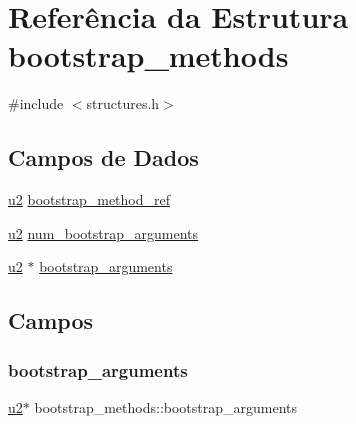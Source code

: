 \hypertarget{structbootstrap__methods}{}\section{Referência da Estrutura bootstrap\+\_\+methods}
\label{structbootstrap__methods}


{\ttfamily \#include $<$structures.\+h$>$}

\subsection*{Campos de Dados}
\begin{DoxyCompactItemize}
\item 
\hyperlink{lista__operandos_8h_a732cde1300aafb73b0ea6c2558a7a54f}{u2} \hyperlink{structbootstrap__methods_a480411f5ca41d770aa9ce24ee7e8e1e8}{bootstrap\+\_\+method\+\_\+ref}
\item 
\hyperlink{lista__operandos_8h_a732cde1300aafb73b0ea6c2558a7a54f}{u2} \hyperlink{structbootstrap__methods_aad28739e25a094400551fd1080fdb1f6}{num\+\_\+bootstrap\+\_\+arguments}
\item 
\hyperlink{lista__operandos_8h_a732cde1300aafb73b0ea6c2558a7a54f}{u2} $\ast$ \hyperlink{structbootstrap__methods_a2204bb6639e44938bda3b11fbb32dd10}{bootstrap\+\_\+arguments}
\end{DoxyCompactItemize}


\subsection{Campos}
\mbox{\label{structbootstrap__methods_a2204bb6639e44938bda3b11fbb32dd10}} 
\subsubsection{\texorpdfstring{bootstrap\+\_\+arguments}{bootstrap\_arguments}}
{\footnotesize\ttfamily \hyperlink{lista__operandos_8h_a732cde1300aafb73b0ea6c2558a7a54f}{u2}$\ast$ bootstrap\+\_\+methods\+::bootstrap\+\_\+arguments}

\mbox{\label{structbootstrap__methods_a480411f5ca41d770aa9ce24ee7e8e1e8}} 
